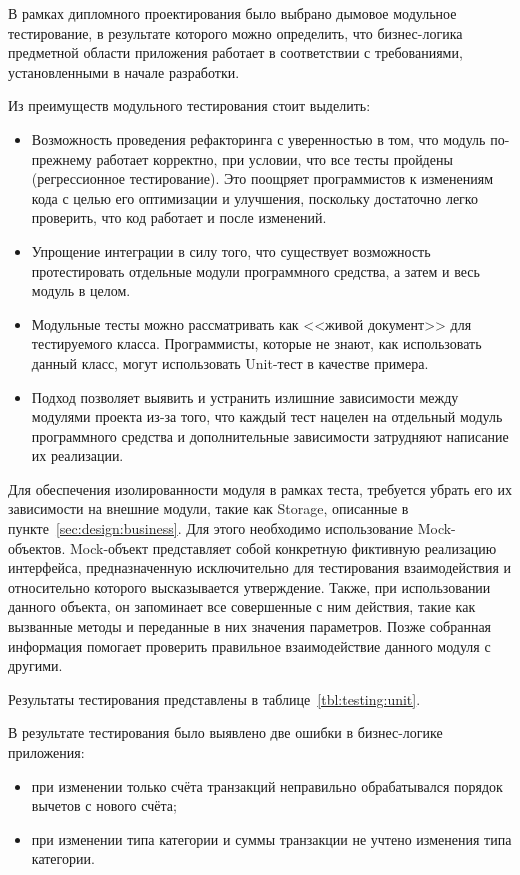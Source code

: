 В рамках дипломного проектирования было выбрано дымовое модульное тестирование, в результате которого можно определить, что бизнес-логика предметной области приложения работает в соответствии с требованиями, установленными в начале разработки.

Из преимуществ модульного тестирования стоит выделить:
\begin{itemize}
    \item Возможность проведения рефакторинга с уверенностью в том, что модуль по-прежнему работает корректно, при условии, что все тесты пройдены (регрессионное тестирование).
    Это поощряет программистов к изменениям кода с целью его оптимизации и улучшения, поскольку достаточно легко проверить, что код работает и после изменений.
    \item Упрощение интеграции в силу того, что существует возможность протестировать отдельные модули программного средства, а затем и весь модуль в целом.
    \item Модульные тесты можно рассматривать как <<живой документ>> для тестируемого класса.
    Программисты, которые не знают, как использовать данный класс, могут использовать Unit-тест в качестве примера.
    \item Подход позволяет выявить и устранить излишние зависимости между модулями проекта из-за того, что каждый тест нацелен на отдельный модуль программного средства и дополнительные зависимости затрудняют написание их реализации.
\end{itemize}

Для обеспечения изолированности модуля в рамках теста, требуется убрать его их зависимости на внешние модули, такие как Storage, описанные в пункте~\ref{sec:design:business}.
Для этого необходимо использование Mock-объектов.
Mock-объект представляет собой конкретную фиктивную реализацию интерфейса, предназначенную исключительно для тестирования взаимодействия и относительно которого высказывается утверждение.
Также, при использовании данного объекта, он запоминает все совершенные с ним действия, такие как вызванные методы и переданные в них значения параметров.
Позже собранная информация помогает проверить правильное взаимодействие данного модуля с другими.

Результаты тестирования представлены в таблице~\ref{tbl:testing:unit}.

В результате тестирования было выявлено две ошибки в бизнес-логике приложения:
\begin{itemize}
    \item при изменении только счёта транзакций неправильно обрабатывался порядок вычетов с нового счёта;
    \item при изменении типа категории и суммы транзакции не учтено изменения типа категории.
\end{itemize}

